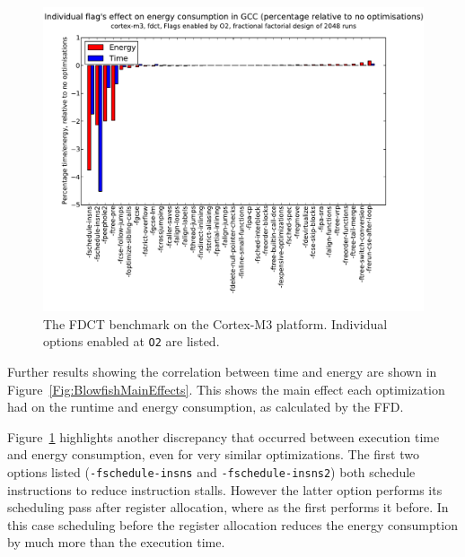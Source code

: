 \documentclass[twocolumn]{article}
\let\oldcaption\caption
\renewcommand{\caption}[1]{\oldcaption{\textup{#1}}}
\begin{document}
\begin{figure}[bt!]
	\includegraphics[width=\linewidth,clip,trim=0.5cm 0 2cm 1.8cm]{cortex-m3/O2_main_effects_fdct.pdf}
	\caption{The FDCT benchmark on the Cortex-M3 platform. Individual options enabled at \texttt{O2} are listed.}
	\label{Fig:FdctO2MainEffects}
\end{figure}

Further results showing the correlation between time and energy are shown in Figure~\ref{Fig:BlowfishMainEffects}. This shows the main effect each optimization had on the runtime and energy consumption, as calculated by the FFD.



Figure~\ref{Fig:FdctO2MainEffects} highlights another discrepancy that occurred between execution time and energy consumption, even for very similar optimizations. The first two options listed (\texttt{-fschedule-insns} and \texttt{-fschedule-insns2}) both schedule instructions to reduce instruction stalls. However the latter option performs its scheduling pass after register allocation, where as the first performs it before. In this case scheduling before the register allocation reduces the energy consumption by much more than the execution time.
\end{document}
